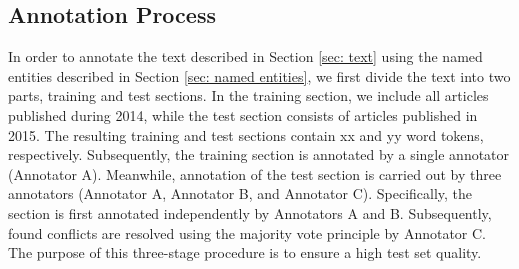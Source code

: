 \documentclass[11pt]{article}
\begin{document}







\subsection{Annotation Process}

In order to annotate the text described in Section \ref{sec: text} using the named entities described in Section \ref{sec: named entities}, we first divide the text into two parts, training and test sections. In the training section, we include all articles published during 2014, while the test section consists of articles published in 2015. The resulting training and test sections contain xx and yy word tokens, respectively. Subsequently, the training section is annotated by a single annotator (Annotator A). Meanwhile, annotation of the test section is carried out by three annotators (Annotator A, Annotator B, and Annotator C). Specifically, the section is first annotated independently by Annotators A and B. Subsequently, found conflicts are resolved using the majority vote principle by Annotator C. The purpose of this three-stage procedure is to ensure a high test set quality.
\end{document}
